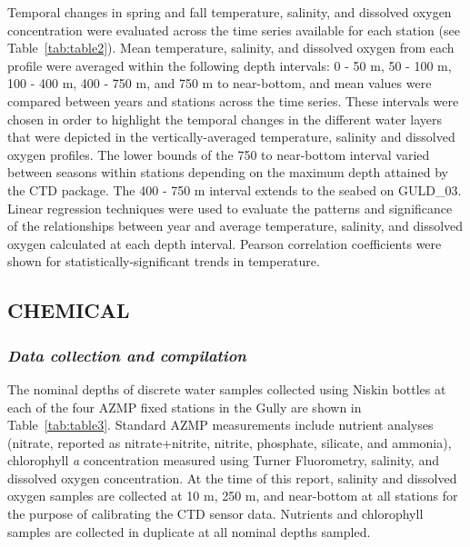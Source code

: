 \documentclass[12pt]{article}\usepackage[]{graphicx}\usepackage[]{color}
\begin{document}
Temporal changes in spring and fall temperature, salinity, and dissolved oxygen concentration were evaluated across the time series available for each station (see Table~\ref{tab:table2}). Mean temperature, salinity, and dissolved oxygen from each profile were averaged within the following depth intervals: 0 - 50 m, 50 - 100 m, 100 - 400 m, 400 - 750 m, and 750 m to near-bottom, and mean values were compared between years and stations across the time series. These intervals were chosen in order to highlight the temporal changes in the different water layers that were depicted in the vertically-averaged temperature, salinity and dissolved oxygen profiles. The lower bounds of the 750 to near-bottom interval varied between seasons within stations depending on the maximum depth attained by the CTD package. The 400 - 750 m interval extends to the seabed on GULD\_03. Linear regression techniques were used to evaluate the patterns and significance of the relationships between year and average temperature, salinity, and dissolved oxygen calculated at each depth interval. Pearson correlation coefficients were shown for statistically-significant trends in temperature.

\hypertarget{sec:chemical-data}{%
\subsection{\texorpdfstring{\textbf{CHEMICAL}}{CHEMICAL}}\label{sec:chemical-data}}

\hypertarget{data-collection-and-compilation-1}{%
\subsubsection{\texorpdfstring{\emph{Data collection and compilation}}{Data collection and compilation}}\label{data-collection-and-compilation-1}}

The nominal depths of discrete water samples collected using Niskin bottles at each of the four AZMP fixed stations in the Gully are shown in Table~\ref{tab:table3}. Standard AZMP measurements include nutrient analyses (nitrate, reported as nitrate+nitrite, nitrite, phosphate, silicate, and ammonia), chlorophyll \emph{a} concentration measured using Turner Fluorometry, salinity, and dissolved oxygen concentration. At the time of this report, salinity and dissolved oxygen samples are collected at 10 m, 250 m, and near-bottom at all stations for the purpose of calibrating the CTD sensor data. Nutrients and chlorophyll samples are collected in duplicate at all nominal depths sampled.
\end{document}
